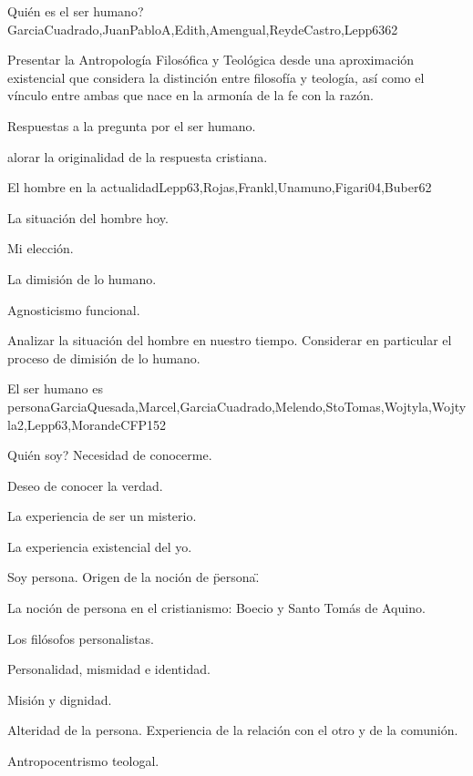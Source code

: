 \begin{syllabus}
\begin{unit}{Quién es el ser humano?}{GarciaCuadrado,JuanPabloA,Edith,Amengual,ReydeCastro,Lepp63}{6}{2}
\begin{unitgoals}
	\item Presentar la Antropología Filosófica y Teológica desde una aproximación existencial que considera la distinción entre filosofía y teología, así como el vínculo entre ambas que nace en la armonía de la fe con la razón.
	\item Respuestas a la pregunta por el ser humano.
	\item alorar la originalidad de la respuesta cristiana.
\end{unitgoals}
\end{unit}

\begin{unit}{El hombre en la actualidad}{Lepp63,Rojas,Frankl,Unamuno,Figari04,Buber}{6}{2}
\begin{topics}
 		\item La situación del hombre hoy.
 		\item Mi elección.
 		\item La dimisión de lo humano.
 		\item Agnosticismo funcional.
\end{topics}

\begin{unitgoals}
	\item Analizar la situación del hombre en nuestro tiempo. Considerar en particular el proceso de dimisión de lo humano. 
\end{unitgoals}
\end{unit}

\begin{unit}{El ser humano es persona}{GarciaQuesada,Marcel,GarciaCuadrado,Melendo,StoTomas,Wojtyla,Wojtyla2,Lepp63,MorandeCFP}{15}{2}
\begin{topics}
 		\item Quién soy? Necesidad de conocerme.
 		\item Deseo de conocer la verdad.
 		\item La experiencia de ser un misterio.
 		\item La experiencia existencial del yo.
 		\item Soy persona. Origen de la noción de \"persona\".
 		\item La noción de persona en el cristianismo: Boecio y Santo Tomás de Aquino.
 		\item Los filósofos personalistas.
 		\item Personalidad, mismidad e identidad.
 		\item Misión y dignidad.
 		\item Alteridad de la persona. Experiencia de la relación con el otro y de la comunión.
 		\item Antropocentrismo teologal.
\end{topics}


\end{unit}
\end{syllabus}
